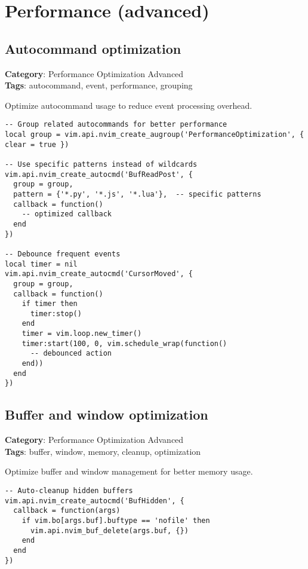 {{{{{{{{{\chapter{Performance (advanced)}
\section{Autocommand optimization}

\textbf{Category}: Performance Optimization Advanced\\ \textbf{Tags}: autocommand, event, performance, grouping
\vspace{0.5cm}

Optimize autocommand usage to reduce event processing overhead.

\begin{Exa*}{}
\begin{Verbatim}[fontsize=\footnotesize, breaklines, breakanywhere]
-- Group related autocommands for better performance
local group = vim.api.nvim_create_augroup('PerformanceOptimization', { clear = true })

-- Use specific patterns instead of wildcards
vim.api.nvim_create_autocmd('BufReadPost', {
  group = group,
  pattern = {'*.py', '*.js', '*.lua'},  -- specific patterns
  callback = function()
    -- optimized callback
  end
})

-- Debounce frequent events
local timer = nil
vim.api.nvim_create_autocmd('CursorMoved', {
  group = group,
  callback = function()
    if timer then
      timer:stop()
    end
    timer = vim.loop.new_timer()
    timer:start(100, 0, vim.schedule_wrap(function()
      -- debounced action
    end))
  end
})
\end{Verbatim}
\end{Exa*}

\section{Buffer and window optimization}

\textbf{Category}: Performance Optimization Advanced\\ \textbf{Tags}: buffer, window, memory, cleanup, optimization
\vspace{0.5cm}

Optimize buffer and window management for better memory usage.

\begin{Exa*}{}
\begin{Verbatim}[fontsize=\footnotesize, breaklines, breakanywhere]
-- Auto-cleanup hidden buffers
vim.api.nvim_create_autocmd('BufHidden', {
  callback = function(args)
    if vim.bo[args.buf].buftype == 'nofile' then
      vim.api.nvim_buf_delete(args.buf, {})
    end
  end
})


\end{Verbatim}
\end{Exa*}}}}}}}}}}
